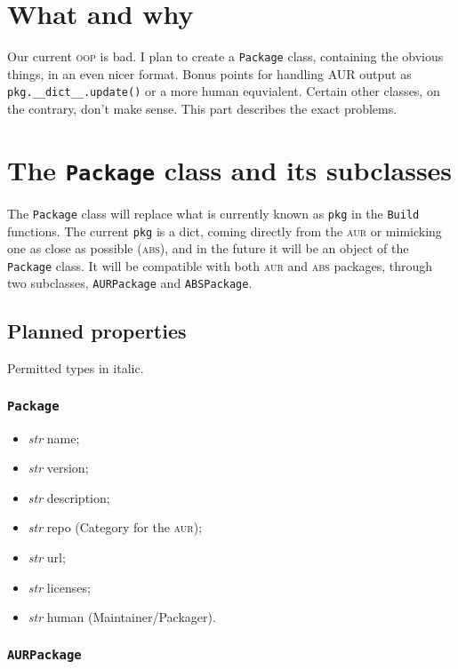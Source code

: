 \documentclass[a4paper,english]{book}
\numberwithin{equation}{section}
\newcommand{\p}[1]{\nohyphens{\texttt{#1}}}
\begin{document}
\chapter{What and why}

Our current \textsc{oop} is bad.  I plan to create a \p{Package} class, containing the obvious things, in an even nicer format.  Bonus points for handling AUR output as \p{pkg.\_\_dict\_\_.update()} or a more human equvialent.  Certain other classes, on the contrary, don’t make sense.  This part describes the exact problems.

\chapter{The \p{Package} class and its subclasses} \label{chap:2:package}

The \p{Package} class will replace what is currently known as \p{pkg} in the \p{Build} functions.  The current \p{pkg} is a dict, coming directly from the \textsc{aur} or mimicking one as close as possible (\textsc{abs}), and in the future it will be an object of the \p{Package} class.  It will be compatible with both \textsc{aur} and \textsc{abs} packages, through two subclasses, \p{AURPackage} and \p{ABSPackage}.

\section{Planned properties}

Permitted types in italic.

\subsection{\p{Package}}
\begin{itemize}
\item \emph{str} name;
\item \emph{str} version;
\item \emph{str} description;
\item \emph{str} repo (Category for the \textsc{aur});
\item \emph{str} url;
\item \emph{str} licenses;
\item \emph{str} human (Maintainer/Packager).
\end{itemize}

\subsection{\p{AURPackage}}
\end{document}

